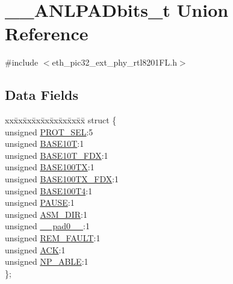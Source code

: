 \hypertarget{union_____a_n_l_p_a_dbits__t}{}\section{\+\_\+\+\_\+\+A\+N\+L\+P\+A\+Dbits\+\_\+t Union Reference}
\label{union_____a_n_l_p_a_dbits__t}


{\ttfamily \#include $<$eth\+\_\+pic32\+\_\+ext\+\_\+phy\+\_\+rtl8201\+F\+L.\+h$>$}

\subsection*{Data Fields}
\begin{DoxyCompactItemize}
\item 
\begin{tabbing}
xx\=xx\=xx\=xx\=xx\=xx\=xx\=xx\=xx\=\kill
struct \{\\
\>unsigned \hyperlink{union_____a_n_l_p_a_dbits__t_a05f4c23498c1cea5cfbfbbbc964f044b}{PROT\_SEL}:5\\
\>unsigned \hyperlink{union_____a_n_l_p_a_dbits__t_a19e0499585f3d54c98df590edff71b52}{BASE10T}:1\\
\>unsigned \hyperlink{union_____a_n_l_p_a_dbits__t_a60f1f5eeed205a15bb647dffff3a2ee3}{BASE10T\_FDX}:1\\
\>unsigned \hyperlink{union_____a_n_l_p_a_dbits__t_ad869e01954d2d35cb31bd254c50c44e1}{BASE100TX}:1\\
\>unsigned \hyperlink{union_____a_n_l_p_a_dbits__t_a62518f2f0d4bbb7e6f305cf513b7db56}{BASE100TX\_FDX}:1\\
\>unsigned \hyperlink{union_____a_n_l_p_a_dbits__t_ae7aa36d7ff2e31c4eb9726c67e04dfea}{BASE100T4}:1\\
\>unsigned \hyperlink{union_____a_n_l_p_a_dbits__t_ad4492e8a008bd744e8ee4a73bc202e78}{PAUSE}:1\\
\>unsigned \hyperlink{union_____a_n_l_p_a_dbits__t_a9ce4718733bcc9d125f46da36557d868}{ASM\_DIR}:1\\
\>unsigned \hyperlink{union_____a_n_l_p_a_dbits__t_adf71f3d8410c1f1dbbc96680a92c49af}{\_\_pad0\_\_}:1\\
\>unsigned \hyperlink{union_____a_n_l_p_a_dbits__t_acff720284bf641e0b589ea7feb2d3199}{REM\_FAULT}:1\\
\>unsigned \hyperlink{union_____a_n_l_p_a_dbits__t_a9d5913829bb2b681dc6257fc7e9b7a56}{ACK}:1\\
\>unsigned \hyperlink{union_____a_n_l_p_a_dbits__t_a4502f03b3664f0c1b02bfbfdae50f349}{NP\_ABLE}:1\\
\}; \\


\end{tabbing}
\end{DoxyCompactItemize}
